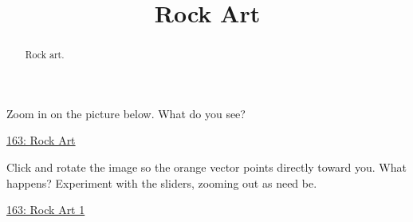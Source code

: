 \documentclass{ximera}
\title{Rock Art}
\begin{document}
\begin{abstract}
Rock art.
\end{abstract}
\maketitle



\begin{exploration}
Zoom in on the picture below. What do you see?
\begin{onlineOnly}
    \begin{center}
\end{center}
\end{onlineOnly}

\href{https://www.desmos.com/calculator/awoec8d6pq}{163: Rock Art}
\end{exploration}


\begin{exploration}
Click and rotate the image so the orange vector points directly toward you. What happens? Experiment with the sliders, zooming out as need be.
\begin{onlineOnly}
    \begin{center}
\end{center}
\end{onlineOnly}

\href{https://www.desmos.com/3d/9g2timus2m}{163: Rock Art 1}
\end{exploration}
\end{document}
